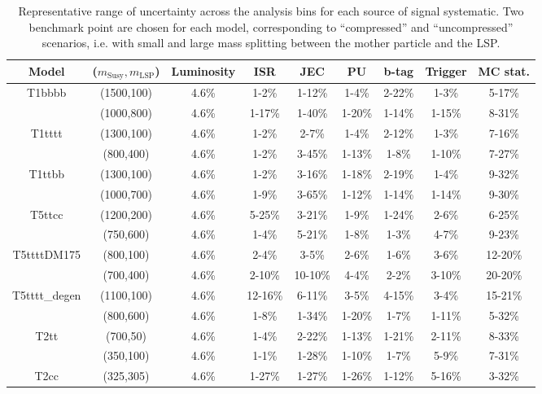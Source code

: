 \begin{table}[h!]
  \caption{Representative range of uncertainty across the analysis bins 
    for each source of signal systematic.
    Two benchmark point are chosen for each model, 
    corresponding to ``compressed'' and ``uncompressed'' scenarios, 
    i.e. with small and large mass splitting between the mother particle and the LSP.
  }
  \label{tab:sig-systematics}
  \centering
  \begin{tabular}{ ccccccccc }
    \hline
    \hline
Model & ($m_{\mathrm{Susy}},m_{\mathrm{LSP}}$) & Luminosity & ISR & JEC & PU & b-tag & Trigger & MC stat. \\ \hline
\multirow{2}{*}{T1bbbb}
 & (1500,100) & 4.6\% & 1-2\% & 1-12\% & 1-4\% & 2-22\% & 1-3\% & 5-17\% \\ 
 & (1000,800) & 4.6\% & 1-17\% & 1-40\% & 1-20\% & 1-14\% & 1-15\% & 8-31\% \\ \hline 
\multirow{2}{*}{T1tttt}
 & (1300,100) & 4.6\% & 1-2\% & 2-7\% & 1-4\% & 2-12\% & 1-3\% & 7-16\% \\ 
 & (800,400) & 4.6\% & 1-2\% & 3-45\% & 1-13\% & 1-8\% & 1-10\% & 7-27\% \\ \hline 
\multirow{2}{*}{T1ttbb}
 & (1300,100) & 4.6\% & 1-2\% & 3-16\% & 1-18\% & 2-19\% & 1-4\% & 9-32\% \\ 
 & (1000,700) & 4.6\% & 1-9\% & 3-65\% & 1-12\% & 1-14\% & 1-14\% & 9-30\% \\ \hline 
\multirow{2}{*}{T5ttcc}
 & (1200,200) & 4.6\% & 5-25\% & 3-21\% & 1-9\% & 1-24\% & 2-6\% & 6-25\% \\ 
 & (750,600) & 4.6\% & 1-4\% & 5-21\% & 1-8\% & 1-3\% & 4-7\% & 9-23\% \\ \hline 
\multirow{2}{*}{T5ttttDM175}
 & (800,100) & 4.6\% & 2-4\% & 3-5\% & 2-6\% & 1-6\% & 3-6\% & 12-20\% \\ 
 & (700,400) & 4.6\% & 2-10\% & 10-10\% & 4-4\% & 2-2\% & 3-10\% & 20-20\% \\ \hline 
\multirow{2}{*}{T5tttt\_degen}
 & (1100,100) & 4.6\% & 12-16\% & 6-11\% & 3-5\% & 4-15\% & 3-4\% & 15-21\% \\ 
 & (800,600) & 4.6\% & 1-8\% & 1-34\% & 1-20\% & 1-7\% & 1-11\% & 5-32\% \\ \hline 
\multirow{2}{*}{T2tt}
 & (700,50) & 4.6\% & 1-4\% & 2-22\% & 1-13\% & 1-21\% & 2-11\% & 8-33\% \\ 
 & (350,100) & 4.6\% & 1-1\% & 1-28\% & 1-10\% & 1-7\% & 5-9\% & 7-31\% \\ \hline 
\multirow{1}{*}{T2cc}
 & (325,305) & 4.6\% & 1-27\% & 1-27\% & 1-26\% & 1-12\% & 5-16\% & 3-32\% \\ \hline 

\end{tabular}
\end{table}
